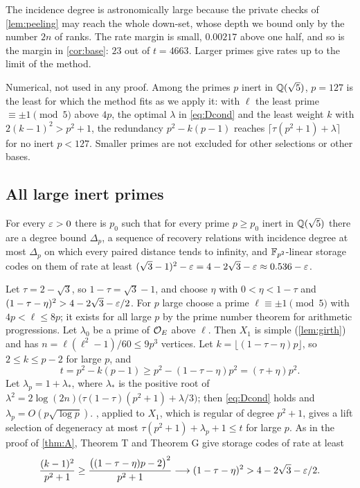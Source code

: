 The incidence degree is astronomically large because the private checks of \cref{lem:peeling} may reach the whole
down-set, whose depth we bound only by the number $2n$ of ranks. The rate margin is small, $0.00217$ above one half, and
so is the margin in \cref{cor:base}: $23$ out of $t=4663$. Larger primes give rates up to the limit of the method.

\begin{remark}\label{rem:leastprime}
Numerical, not used in any proof. Among the primes $p$ inert in $\mathbb{Q}(\sqrt5)$, $p=127$ is the least for which the
method fits as we apply it: with $\ell$ the least prime $\equiv\pm1\pmod5$ above $4p$, the optimal $\lambda$ in
\eqref{eq:Dcond} and the least weight $k$ with $2(k-1)^2>p^2+1$, the redundancy $p^2-k(p-1)$ reaches
$\lceil\tau(p^2+1)+\lambda\rceil$ for no inert $p<127$. Smaller primes are not excluded for other selections or other
bases.
\end{remark}

\subsection{All large inert primes}\label{sec:theoremA-general}

\begin{theorem}[Theorem A$^*$]\label{thm:Astar}
\notformalized
For every $\varepsilon>0$ there is $p_0$ such that for every prime $p\ge p_0$ inert in $\mathbb{Q}(\sqrt5)$ there are a degree bound
$\Delta_p$, a sequence of recovery relations with incidence degree at most $\Delta_p$ on which every paired distance tends to
infinity, and $\mathbb{F}_{p^2}$-linear storage codes on them of rate at least $(\sqrt3-1)^2-\varepsilon=4-2\sqrt3-\varepsilon\approx0.536-\varepsilon$.
\end{theorem}
\begin{informalproof}
Let $\tau=2-\sqrt3$, so $1-\tau=\sqrt3-1$, and choose $\eta$ with $0<\eta<1-\tau$ and
$(1-\tau-\eta)^2>4-2\sqrt3-\varepsilon/2$. For $p$ large
choose a prime $\ell\equiv\pm1\pmod5$ with $4p<\ell\le8p$; it exists for all large $p$ by the prime number theorem for
arithmetic progressions. Let $\lambda_0$ be a prime of $\mathcal{O}_E$ above $\ell$. Then $X_1$ is simple (\cref{lem:girth}) and has
$n=\ell(\ell^2-1)/60\le9p^3$ vertices. Let $k=\lfloor(1-\tau-\eta)p\rfloor$, so $2\le k\le p-2$ for large $p$, and
\[
  t=p^2-k(p-1)\ge p^2-(1-\tau-\eta)p^2=(\tau+\eta)p^2.
\]
Let $\lambda_p=1+\lambda_*$, where $\lambda_*$ is the positive root of
$\lambda^2=2\log(2n)\bigl(\tau(1-\tau)(p^2+1)+\lambda/3\bigr)$; then \eqref{eq:Dcond} holds and $\lambda_p=O(p\sqrt{\log p})$.
, applied to $X_1$, which is regular of degree $p^2+1$, gives a lift selection of degeneracy at most
$\tau(p^2+1)+\lambda_p+1\le t$ for large $p$. As in the proof of \cref{thm:A}, Theorem T and Theorem G
give storage codes of rate at least
\[
  \frac{(k-1)^2}{p^2+1}\ge\frac{\bigl((1-\tau-\eta)p-2\bigr)^2}{p^2+1}\longrightarrow(1-\tau-\eta)^2>4-2\sqrt3-\varepsilon/2.
\]
\end{informalproof}

